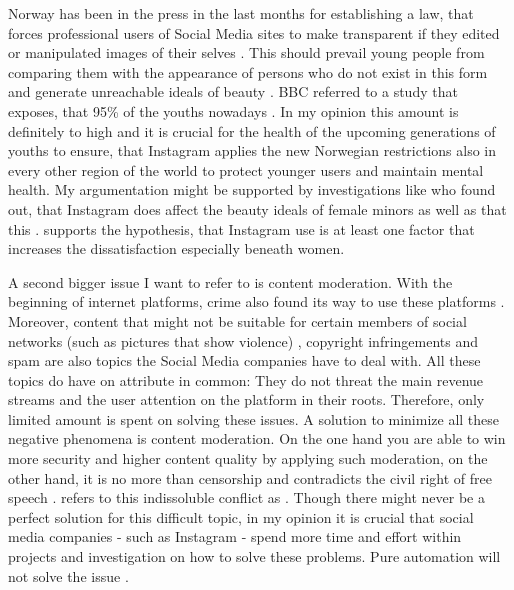 \documentclass[11pt,letterpaper]{article}
\begin{document}
Norway has been in the press in the last months for establishing a law, that forces professional users of Social Media sites to make transparent if they edited or manipulated images of their selves \autocite[][]{PressReynolds.2021}. This should prevail young people from comparing them with the appearance of persons who do not exist in this form and generate unreachable ideals of beauty \autocite[][]{PressReynolds.2021}. BBC referred to a study that exposes, that 95\% of the youths nowadays  \autocite[][]{Grant.2021}. In my opinion this amount is definitely to high and it is crucial for the health of the upcoming generations of youths to ensure, that Instagram applies the new Norwegian restrictions also in every other region of the world to protect younger users and maintain mental health. My argumentation might be supported by investigations like \cite[p. 501]{Babaleye.2020} who found out, that Instagram does affect the beauty ideals of female minors as well as that this . \cite[p. 1]{Rafati.2021} supports the hypothesis, that Instagram use is at least one factor that increases the dissatisfaction especially beneath women.

A second bigger issue I want to refer to is content moderation. With the beginning of internet platforms, crime also found its way to use these platforms \autocite[][]{Gupta.2021}. Moreover, content that might not be suitable for certain members of social networks (such as pictures that show violence) \autocite[][pp. 225 - 226]{Mengu.2015}, copyright infringements \autocite[][]{Hegemann.2019} and spam \autocite[][p. 1458]{Jin.2011} are also topics the Social Media companies have to deal with. All these topics do have on attribute in common: They do not threat the main revenue streams and the user attention on the platform in their roots. Therefore, only limited amount is spent on solving these issues. A solution to minimize all these negative phenomena is content moderation. On the one hand you are able to win more security and higher content quality by applying such moderation, on the other hand, it is no more than censorship and contradicts the civil right of free speech \autocite[][p. 1359]{Langvardt.2017}. \cite{Langvardt.2017} refers to this indissoluble conflict as . Though there might never be a perfect solution for this difficult topic, in my opinion it is crucial that social media companies - such as Instagram - spend more time and effort within projects and investigation on how to solve these problems. Pure automation will not solve the issue \autocite[][pp. 3 - 4]{Gillespie.2020}.
\end{document}
